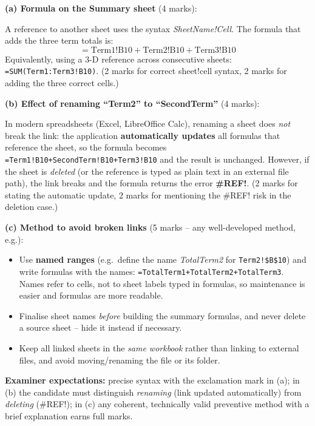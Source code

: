 \documentclass[11pt]{article}
\begin{document}
\begin{corrige}
\textbf{(a) Formula on the Summary sheet} (4 marks):

A reference to another sheet uses the syntax \emph{SheetName!Cell}. The formula that adds the three term totals is:
\[ =\text{Term1!B10}+\text{Term2!B10}+\text{Term3!B10} \]
Equivalently, using a 3-D reference across consecutive sheets: \texttt{=SUM(Term1:Term3!B10)}. (2 marks for correct sheet!cell syntax, 2 marks for adding the three correct cells.)

\textbf{(b) Effect of renaming ``Term2'' to ``SecondTerm''} (4 marks):

In modern spreadsheets (Excel, LibreOffice Calc), renaming a sheet does \emph{not} break the link: the application \textbf{automatically updates} all formulas that reference the sheet, so the formula becomes \texttt{=Term1!B10+SecondTerm!B10+Term3!B10} and the result is unchanged. However, if the sheet is \emph{deleted} (or the reference is typed as plain text in an external file path), the link breaks and the formula returns the error \textbf{\#REF!}. (2 marks for stating the automatic update, 2 marks for mentioning the \#REF! risk in the deletion case.)

\textbf{(c) Method to avoid broken links} (5 marks -- any well-developed method, e.g.):
\begin{itemize}
\item Use \textbf{named ranges} (e.g.\ define the name \emph{TotalTerm2} for \texttt{Term2!\$B\$10}) and write formulas with the names: \texttt{=TotalTerm1+TotalTerm2+TotalTerm3}. Names refer to cells, not to sheet labels typed in formulas, so maintenance is easier and formulas are more readable.
\item Finalise sheet names \emph{before} building the summary formulas, and never delete a source sheet -- hide it instead if necessary.
\item Keep all linked sheets in the \emph{same workbook} rather than linking to external files, and avoid moving/renaming the file or its folder.
\end{itemize}

\textbf{Examiner expectations:} precise syntax with the exclamation mark in (a); in (b) the candidate must distinguish \emph{renaming} (link updated automatically) from \emph{deleting} (\#REF!); in (c) any coherent, technically valid preventive method with a brief explanation earns full marks.
\end{corrige}
\end{document}
